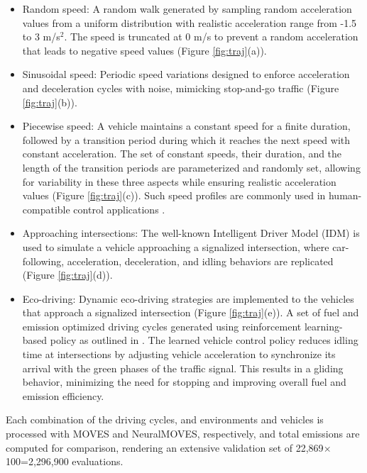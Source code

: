 \documentclass[12pt,english]{article}
\begin{document}
\begin{itemize}
    \item Random speed: A random walk generated by sampling random acceleration values from a uniform distribution with realistic acceleration range from -1.5 to 3 m/s$^2$. 
    The speed is truncated at 0 m/s to prevent a random acceleration that leads to negative speed values (Figure \ref{fig:traj}(a)).
    
    \item Sinusoidal speed: Periodic speed variations designed to enforce  acceleration and deceleration cycles with noise, mimicking stop-and-go traffic (Figure \ref{fig:traj}(b)). 

    \item Piecewise speed: A vehicle maintains a constant speed for a finite duration, followed by a transition period during which it reaches the next speed with constant acceleration. The set of constant speeds, their duration, and the length of the transition periods are parameterized and randomly set, allowing for variability in these three aspects while ensuring realistic acceleration values (Figure \ref{fig:traj}(c)). Such speed profiles are commonly used in human-compatible control applications \citep{mayuri-pwc}.
    
    \item Approaching intersections: The well-known Intelligent Driver Model (IDM) \citep{Treiber2000CongestedTS} is used to simulate a vehicle approaching a signalized intersection, where car-following, acceleration, deceleration, and idling behaviors are replicated (Figure \ref{fig:traj}(d)).

    \item Eco-driving: Dynamic eco-driving strategies are implemented to the vehicles that approach a signalized intersection (Figure \ref{fig:traj}(e)). A set of fuel and emission optimized driving cycles generated using reinforcement learning-based policy as outlined in \cite{jayawardana-eco}. The learned vehicle control policy reduces idling time at intersections by adjusting vehicle acceleration to synchronize its arrival with the green phases of the traffic signal. This results in a gliding behavior, minimizing the need for stopping and improving overall fuel and emission efficiency.

\end{itemize}
Each combination of the driving cycles, and environments and vehicles is processed with MOVES and NeuralMOVES, respectively, and total emissions are computed for comparison, rendering an extensive validation set of 22,869$\times$100=2,296,900 evaluations. 
\end{document}
